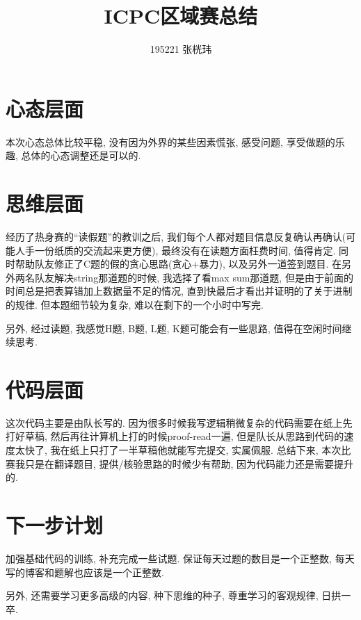 \documentclass[UTF8]{ctexart}
\begin{document}
	\title{ICPC区域赛总结}
	\author{195221 张桄玮}
	\maketitle
	
	\section{心态层面}

	本次心态总体比较平稳, 没有因为外界的某些因素慌张, 感受问题, 享受做题的乐趣, 总体的心态调整还是可以的. 

	\section{思维层面}

	经历了热身赛的``读假题''的教训之后, 我们每个人都对题目信息反复确认再确认(可能人手一份纸质的交流起来更方便), 最终没有在读题方面枉费时间, 值得肯定. 同时帮助队友修正了C题的假的贪心思路(贪心+暴力), 以及另外一道签到题目. 在另外两名队友解决string那道题的时候, 我选择了看max sum那道题, 但是由于前面的时间总是把表算错加上数据量不足的情况, 直到快最后才看出并证明的了关于进制的规律. 但本题细节较为复杂, 难以在剩下的一个小时中写完. 

	另外, 经过读题, 我感觉H题, B题, L题, K题可能会有一些思路, 值得在空闲时间继续思考. 
	\section{代码层面}

	这次代码主要是由队长写的. 因为很多时候我写逻辑稍微复杂的代码需要在纸上先打好草稿, 然后再往计算机上打的时候proof-read一遍, 但是队长从思路到代码的速度太快了, 我在纸上只打了一半草稿他就能写完提交, 实属佩服. 总结下来, 本次比赛我只是在翻译题目, 提供/核验思路的时候少有帮助, 因为代码能力还是需要提升的. 

	\section{下一步计划}

	加强基础代码的训练, 补充完成一些试题. 保证每天过题的数目是一个正整数, 每天写的博客和题解也应该是一个正整数. 

	另外, 还需要学习更多高级的内容, 种下思维的种子, 尊重学习的客观规律, 日拱一卒. 
	
\end{document}
